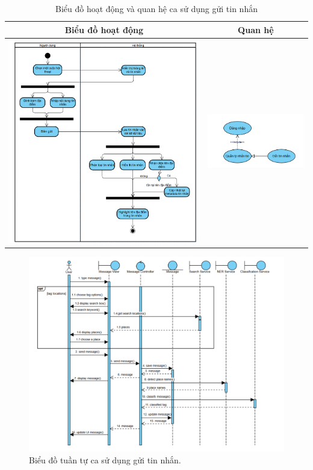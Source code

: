 \begin{table}[H] %
    \centering
    \caption{Biểu đồ hoạt động và quan hệ ca sử dụng gửi tin nhắn} %
    \label{tab:uc_send_message_diagrams} %
    \begin{tabular}{| c | c |}
        \hline
        \textbf{Biểu đồ hoạt động} & \textbf{Quan hệ} \\
        \hline
        \includegraphics[width=0.5\linewidth]{figures/c3/3-3-9-ad.png} %
        &
        \includegraphics[width=0.45\linewidth]{figures/c3/3-3-9-rd.png} \\ %
        \hline
    \end{tabular}
\end{table}

\begin{figure}[H]
    \centering
    \includegraphics[width=1\textwidth]{figures/c3/3-3-9-sd.png} %
    \caption{Biểu đồ tuần tự ca sử dụng gửi tin nhắn.}
    \label{fig:3-3-9-sequence-diagram}
\end{figure}